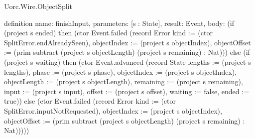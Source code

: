 \begin{lexlean}{Uorc.Wire.ObjectSplit}
\begin{semanticmodule}
definition{
  name: finishInput,
  parameters: [s : State],
  result: Event,
  body: (if (project s ended) then (ctor Event.failed (record Error {kind := (ctor SplitError.endAlreadySeen), objectIndex := (project s objectIndex), objectOffset := (prim subtract (project s objectLength) (project s remaining) : Nat)})) else (if (project s waiting) then (ctor Event.advanced (record State {lengths := (project s lengths), phase := (project s phase), objectIndex := (project s objectIndex), objectLength := (project s objectLength), remaining := (project s remaining), input := (project s input), offset := (project s offset), waiting := false, ended := true})) else (ctor Event.failed (record Error {kind := (ctor SplitError.inputNotRequested), objectIndex := (project s objectIndex), objectOffset := (prim subtract (project s objectLength) (project s remaining) : Nat)}))))
}


\end{semanticmodule}
\end{lexlean}
